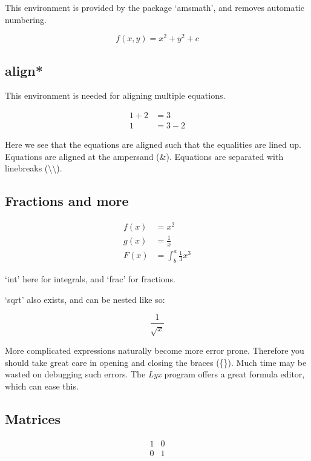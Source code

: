 \documentclass{article}
\begin{document}
This environment is provided by the package `amsmath', and removes automatic numbering.

\begin{equation*}
	f(x, y) = x^2 + y^2 + c
\end{equation*}

\subsection{align*}

This environment is needed for aligning multiple equations.

\begin{align*}
	1 + 2 &= 3\\
	1 &= 3 - 2
\end{align*}

Here we see that the equations are aligned such that the equalities are lined up.
Equations are aligned at the ampersand (\&). Equations are separated with linebreaks (\textbackslash\textbackslash).

\subsection{Fractions and more}

\begin{align*}
	f(x) &= x^2\\
	g(x) &= \frac{1}{x}\\
	F(x) &= \int^a_b \frac{1}{3}x^3
\end{align*}

`int' here for integrals, and `frac' for fractions.

`sqrt' also exists, and can be nested like so:

\begin{equation*}
	\frac{1}{\sqrt{x}}
\end{equation*}

More complicated expressions naturally become more error prone. Therefore you should take great care in opening and closing the braces (\{\}). Much time may be wasted on debugging such errors. The \textit{Lyx} program offers a great formula editor, which can ease this.

\subsection{Matrices}

\begin{equation*}
	\begin{matrix}
		1 & 0\\
		0 & 1
	\end{matrix}
\end{equation*}
\end{document}
